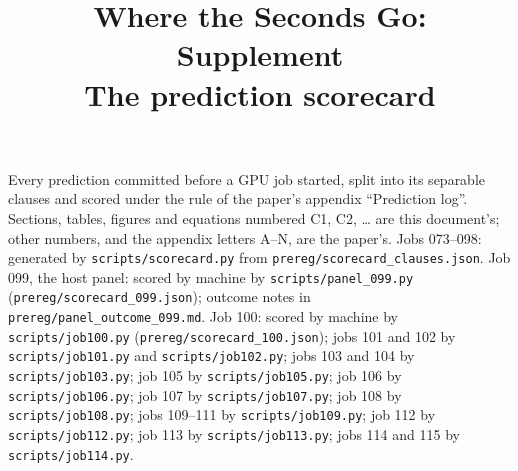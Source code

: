 \documentclass[10pt]{article}
\title{Where the Seconds Go: Supplement\\[2pt]\large The prediction scorecard}
\author{}
\date{}
\begin{document}
\sloppy   %
\maketitle
Every prediction committed before a GPU job started, split into its separable clauses and scored under the rule of
the paper's appendix ``Prediction log''. Sections, tables, figures and equations numbered C1, C2, \ldots{} are this
document's; other numbers, and the appendix letters A--N, are the paper's. Jobs 073--098: generated by \texttt{scripts/scorecard.py} from
\texttt{prereg/scorecard\_clauses.json}. Job 099, the host panel: scored by machine by \texttt{scripts/panel\_099.py}
(\texttt{prereg/scorecard\_099.json}); outcome notes in \texttt{prereg/panel\_outcome\_099.md}. Job 100: scored by
machine by \texttt{scripts/job100.py} (\texttt{prereg/scorecard\_100.json}); jobs 101 and 102 by \texttt{scripts/job101.py} and
\texttt{scripts/job102.py}; jobs 103 and 104 by \texttt{scripts/job103.py}; job 105 by \texttt{scripts/job105.py}; job 106 by \texttt{scripts/job106.py}; job 107 by \texttt{scripts/job107.py}; job 108 by \texttt{scripts/job108.py}; jobs 109--111 by \texttt{scripts/job109.py}; job 112 by \texttt{scripts/job112.py}; job 113 by \texttt{scripts/job113.py}; jobs 114 and 115 by \texttt{scripts/job114.py}.

\clearpage
\appendix
\renewcommand{\thesection}{C\arabic{section}}

\clearpage

\clearpage


\end{document}
